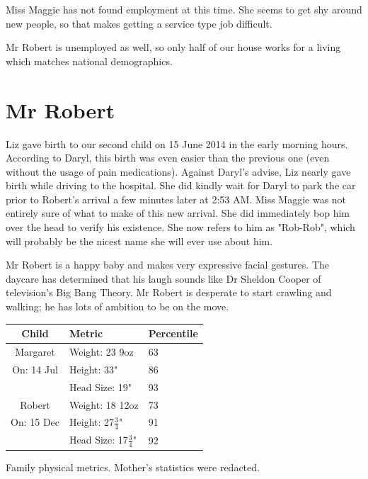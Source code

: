 \documentclass{article}
\makeatletter
\newenvironment{tablehere}
  {\def\@captype{table}}
  {}
\makeatother
\begin{document}
\begin{multicols}{2}
Miss Maggie has not found employment at this time.  She seems to get shy 
around new people, so that makes getting a service type job difficult.  

Mr Robert is unemployed as well, so only half of our house works for a 
living which matches national demographics.

\section{Mr Robert}

Liz gave birth to our second child on 15 June 2014 in the early morning 
hours.  According to Daryl, this birth was even easier than the previous 
one (even without the usage of pain medications).  
Against Daryl's advise, Liz nearly gave birth while driving to the 
hospital.  She did kindly wait for Daryl to park the car prior to Robert's 
arrival a few minutes later at 2:53 AM.  Miss Maggie was not entirely sure 
of what to make of this new arrival. She did immediately bop him over the 
head to verify his existence.  She now refers to him as "Rob-Rob", which 
will probably be the nicest name she will ever use about him.  

Mr Robert is a happy baby and makes very expressive facial gestures.  The 
daycare has determined that his laugh sounds like Dr Sheldon Cooper of 
television's Big Bang Theory.  Mr Robert is desperate to start crawling
and walking; he has lots of ambition to be on the move.

\begin{tablehere}
 \begin{center}
  \begin{tabular}{|c|l|l|}
   \multicolumn{1}{c}{Child} &
   \multicolumn{1}{l}{Metric} &
   \multicolumn{1}{l}{Percentile} \\ \hline \hline
   Margaret & Weight: 23 9oz & 63 \\
   On: 14 Jul & Height: 33" & 86 \\
    & Head Size: 19" & 93 \\
   Robert & Weight: 18 12oz & 73 \\
   On: 15 Dec & Height: 27$\frac{3}{4}$" & 91 \\
    & Head Size: 17$\frac{3}{4}$" & 92 \\
\hline
  \end{tabular}
 \end{center}
 \caption{Family physical metrics. Mother's statistics were redacted.}
 \label{table:metrics}
\end{tablehere}


\end{multicols}
\end{document}
